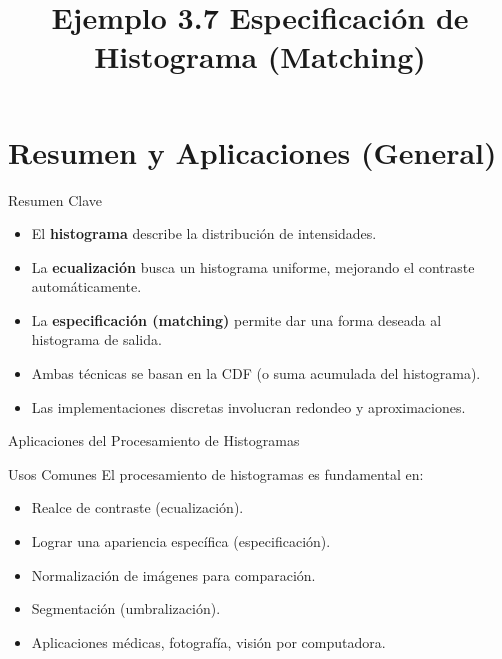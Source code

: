 \documentclass{beamer}
\begin{document}
\section{Resumen y Aplicaciones (General)}

\begin{frame}{Resumen Clave}
  \begin{itemize}
    \item El \textbf{histograma} describe la distribución de intensidades.
    \item La \textbf{ecualización} busca un histograma uniforme, mejorando el contraste automáticamente.
    \item La \textbf{especificación (matching)} permite dar una forma deseada al histograma de salida.
    \item Ambas técnicas se basan en la CDF (o suma acumulada del histograma).
    \item Las implementaciones discretas involucran redondeo y aproximaciones.
  \end{itemize}
\end{frame}

\begin{frame}{Aplicaciones del Procesamiento de Histogramas}
  \begin{block}{Usos Comunes}
    El procesamiento de histogramas es fundamental en:
  \end{block}
    \begin{itemize}
        \item Realce de contraste (ecualización).
        \item Lograr una apariencia específica (especificación).
        \item Normalización de imágenes para comparación.
        \item Segmentación (umbralización).
        \item Aplicaciones médicas, fotografía, visión por computadora.
    \end{itemize}
\end{frame}


\title[Especificación de Histograma (Matching)]{Ejemplo 3.7 Especificación de Histograma (Matching)}
\subtitle{}
\author[Tu Nombre/Institución]{}
\date{}
\institute{}
\begin{frame}
  \titlepage
\end{frame}
\end{document}

